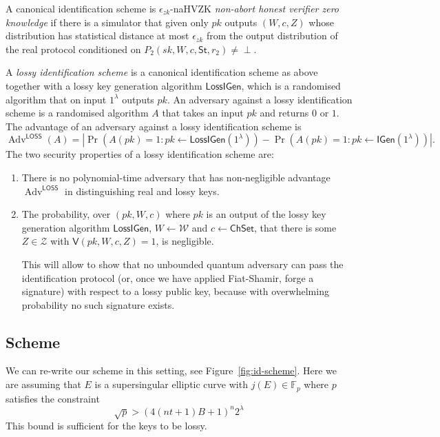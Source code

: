 \documentclass{llncs}
\newcommand{\F}{\mathbb{F}}
\DeclareMathOperator{\Adv}{Adv}
\newcommand{\IGen}{\mathsf{IGen}}
\newcommand{\VV}{\mathsf{V}}
\newcommand{\Wset}{\mathcal{W}}
\newcommand{\Zset}{\mathcal{Z}}
\newcommand{\ChSet}{\textsf{ChSet}}
\newcommand{\St}{\textsf{St}}
\newcommand{\LossIGen}{\mathsf{LossIGen}}
\begin{document}
A canonical identification scheme is $\epsilon_{zk}$-naHVZK \emph{non-abort honest verifier zero knowledge} if there is a simulator that given only $pk$ outputs $(W, c, Z)$ whose distribution has statistical distance at most $\epsilon_{zk}$ from the output distribution of the real protocol conditioned on $P_2( sk, W, c, \St, r_2 ) \ne \perp$.


A \emph{lossy identification scheme} is a canonical identification scheme as above together with a lossy key generation algorithm $\LossIGen$, which is a randomised algorithm that on input $1^\lambda$ outputs $pk$.
An adversary against a lossy identification scheme is a randomised algorithm $A$ that takes an input $pk$ and returns $0$ or $1$.
The advantage of an adversary against a lossy identification scheme is 
\[
   \Adv^{\textsf{LOSS}}(A) = \left|
   \Pr\left( A( pk ) = 1 : pk \leftarrow \LossIGen(1^\lambda) \right) - \Pr\left( A( pk ) = 1 : pk \leftarrow \IGen( 1^\lambda ) \right) \right|.
\]
The two security properties of a lossy identification scheme are:
\begin{enumerate}
\item There is no polynomial-time adversary that has non-negligible advantage $\Adv^{\textsf{LOSS}}$ in distinguishing real and lossy keys.
\item The probability, over $(pk, W, c)$ where $pk$ is an output of the lossy key generation algorithm $\LossIGen$, $W \leftarrow \Wset$ and $c \leftarrow \ChSet$, that there is some $Z \in \Zset$ with $\VV( pk, W, c, Z ) = 1$, is negligible.

This will allow to show that no unbounded quantum adversary can pass the identification protocol (or, once we have applied Fiat-Shamir, forge a signature) with respect to a lossy public key, because with overwhelming probability no such signature exists.
\end{enumerate}


\subsection{Scheme}

We can re-write our scheme in this setting, see Figure~\ref{fig:id-scheme}.
Here we are assuming that $E$ is a supersingular elliptic curve with $j(E) \in \F_p$ where $p$ satisfies the constraint
\begin{equation} \label{eq:lossy-p-bound}
  \sqrt{p} > (4(nt+1)B + 1)^{n} 2^\lambda
\end{equation}
This bound is sufficient for the keys to be lossy.
\end{document}
